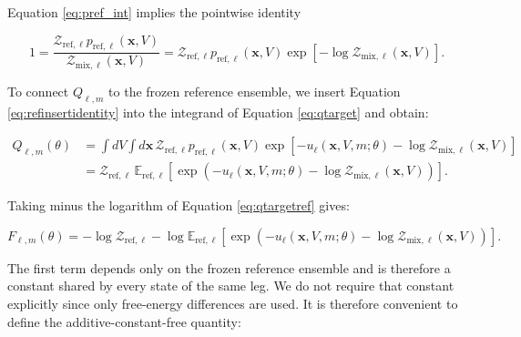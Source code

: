 Equation \eqref{eq:pref_int} implies the pointwise identity

\begin{equation}
    1
    =
    \frac{
        \mathcal{Z}_{\mathrm{ref},\ell}
        p_{\mathrm{ref},\ell}(\mathbf{x}, V)
    }{
        \mathcal{Z}_{\mathrm{mix},\ell}(\mathbf{x}, V)
    }
    =
    \mathcal{Z}_{\mathrm{ref},\ell}
    p_{\mathrm{ref},\ell}(\mathbf{x}, V)
    \exp\left[
        -
        \log \mathcal{Z}_{\mathrm{mix},\ell}(\mathbf{x}, V)
    \right].
    \label{eq:refinsertidentity}
\end{equation}

To connect $Q_{\ell,m}$ to the frozen reference ensemble, we insert Equation \eqref{eq:refinsertidentity} into the integrand of Equation \eqref{eq:qtarget} and obtain:

\begin{align}
    Q_{\ell,m}(\theta)
    &=
    \int dV \int d\mathbf{x} \,
    \mathcal{Z}_{\mathrm{ref},\ell}
    p_{\mathrm{ref},\ell}(\mathbf{x}, V)
    \exp \left[
        -u_\ell(\mathbf{x}, V, m; \theta)
        -
        \log \mathcal{Z}_{\mathrm{mix},\ell}(\mathbf{x}, V)
    \right]
    \nonumber \\
    &=
    \mathcal{Z}_{\mathrm{ref},\ell}
    \,
    \mathbb{E}_{\mathrm{ref},\ell}
    \left[
        \exp \left(
            -u_\ell(\mathbf{x}, V, m; \theta)
            -
            \log \mathcal{Z}_{\mathrm{mix},\ell}(\mathbf{x}, V)
        \right)
    \right].
    \label{eq:qtargetref}
\end{align}

Taking minus the logarithm of Equation \eqref{eq:qtargetref} gives:

\begin{equation}
    F_{\ell,m}(\theta)
    =
    -\log \mathcal{Z}_{\mathrm{ref},\ell}
    -
    \log
    \mathbb{E}_{\mathrm{ref},\ell}
    \left[
        \exp \left(
            -u_\ell(\mathbf{x}, V, m; \theta)
            -
            \log \mathcal{Z}_{\mathrm{mix},\ell}(\mathbf{x}, V)
        \right)
    \right].
    \label{eq:freeref}
\end{equation}

The first term depends only on the frozen reference ensemble and is therefore a constant shared by every state of the same leg. We do not require that constant explicitly since only free-energy differences are used. It is therefore convenient to define the additive-constant-free quantity:

